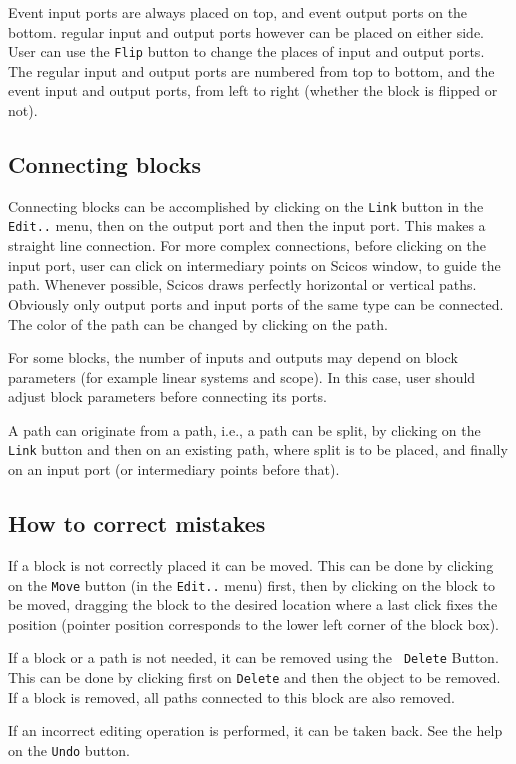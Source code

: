 Event input ports are always placed on top, and event output ports on the
bottom. regular input and output ports however can be placed on either
side. User can use the {\tt Flip} button to change the places of input and
output ports. The regular input and output ports are numbered from top to
bottom, and the event input and output ports, from left to right
(whether the block is flipped or not).

\subsection{Connecting blocks}
Connecting blocks can be accomplished by clicking on the {\tt Link}
button in the {\tt Edit..} menu, then on the output port and then the
input port. This makes a 
straight line connection. For more complex connections, before
clicking on the input port, user can click on intermediary points on
Scicos   window, to guide the path. Whenever possible, Scicos   draws
perfectly horizontal or vertical paths. Obviously only output ports
and input ports of the same type can be connected. The color of the
path can be changed by clicking on the path.

For some blocks, the number of inputs and outputs may depend on block
parameters (for example linear systems and scope). In this case,
user should adjust block parameters before connecting its ports. 

A path can originate from a path, i.e., a path can be split, by clicking
on the {\tt Link} button and then on an existing path, where split is
to be placed, and finally on an input port (or intermediary points
before that). 

\subsection{How to correct mistakes}
If a block is not correctly placed it can be moved. This can be done
by clicking on the {\tt Move} button (in the {\tt Edit..} menu) first,
then by clicking on the block to be moved, dragging the block
to the desired location where a last click fixes the position (pointer
position corresponds to the lower left corner of the block box).

If a block or a path is not needed, it can be removed using the {\tt
Delete} Button. This can be done by clicking first on {\tt Delete}
and then the object to be removed. If a block is removed, all paths
connected to this block are also removed. 

If an incorrect editing operation is performed, it can be taken back. See
the help on the {\tt Undo} button.

